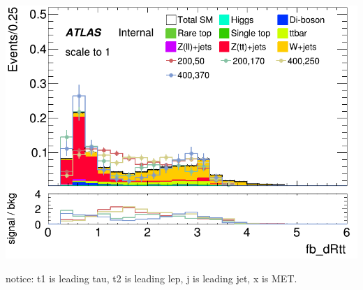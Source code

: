 \documentclass[usenames,dvipsnames]{beamer}
\begin{document}
\begin{frame}
\begin{minipage}{0.32\textwidth}
        \includegraphics[width=\textwidth]{graphics/HH_met_sig/HH_fb_dRtt_norm.png}
    \end{minipage}
    notice: t1 is leading tau, t2 is leading lep, j is leading jet, x is MET.
\end{frame}
\end{document}
